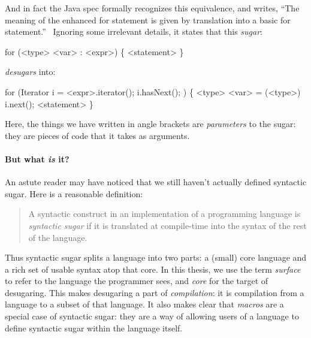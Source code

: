 And in fact the Java spec formally recognizes this equivalence, and
writes, ``The meaning of the enhanced for statement is given by
translation into a basic for statement.''~\cite[section 14.14.2]{java8} Ignoring some
irrelevant details, it states that this \emph{sugar}:
\begin{Codes}
for (<type> <var> : <expr>) \{ <statement> \}
\end{Codes}
\emph{desugars} into:
\begin{Codes}
for (Iterator i = <expr>.iterator(); i.hasNext(); ) \{
  <type> <var> = (<type>) i.next();
  <statement>
\}
\end{Codes}
Here, the things we have written in angle brackets are
\emph{parameters} to the sugar: they are pieces of code that it
takes as arguments.


\paragraph{But what \emph{is} it?}
An astute reader may have noticed that we still haven't actually
defined syntactic sugar. Here is a reasonable definition:
\begin{quote}
  A syntactic construct in an implementation of a programming language
  is \emph{syntactic sugar} if it is translated at compile-time into
  the syntax of the rest of the language.
\end{quote}
Thus syntactic sugar splits a language into two parts: a (small) core
language and a rich set of usable syntax atop that core. In this
thesis, we use the term \emph{surface} to refer to the language the
programmer sees, and \emph{core} for the target of desugaring.
This makes desugaring a part of \emph{compilation}: it is
compilation from a language to a subset of that language. It also
makes clear that \emph{macros} are a special case of syntactic sugar:
they are a way of allowing users of a language to
define syntactic sugar within the language itself.


